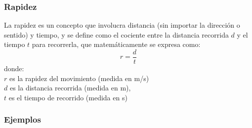 \documentclass[11pt]{book}
\begin{document}
\subsubsection{Rapidez}
La rapidez es un concepto que involucra distancia (sin importar la dirección o sentido) y tiempo,
y se define como el cociente entre la distancia recorrida $d$ y el tiempo $t$ para recorrerla,
que matemáticamente se expresa como:
\begin{equation}
    r=\frac{d}{t}
\end{equation}
donde:\\
$r$ es la rapidez del movimiento (medida en m/s)\\
$d$ es la distancia recorrida (medida en m),\\
$t$ es el tiempo de recorrido (medida en s)


\subsubsection{Ejemplos}
\end{document}
